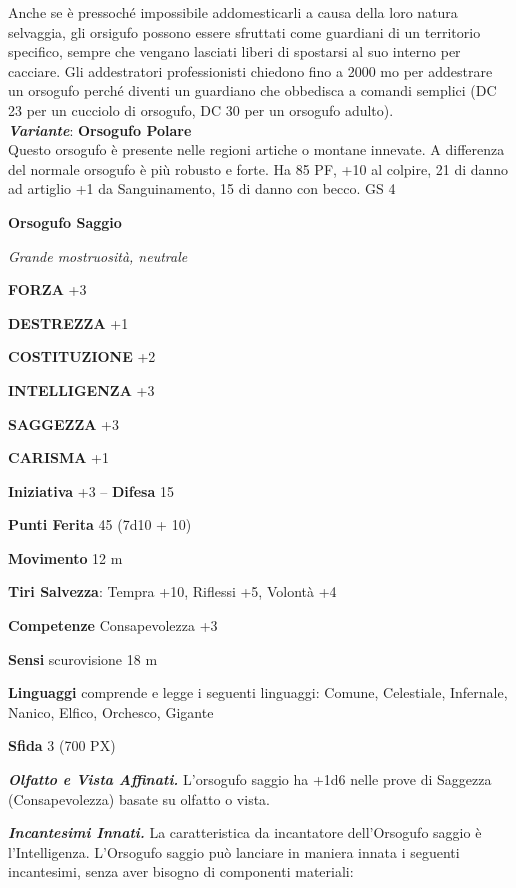 \begin{multicols}{2}
	Anche se è pressoché impossibile addomesticarli a causa della loro natura selvaggia, gli orsigufo possono essere sfruttati come guardiani di un territorio specifico, sempre che vengano lasciati liberi di spostarsi al suo interno per cacciare. Gli addestratori professionisti chiedono fino a 2000 mo per addestrare un orsogufo perché diventi un guardiano che obbedisca a comandi semplici (DC 23 per un cucciolo di orsogufo, DC 30 per un orsogufo adulto).\\

	\textit{\textbf{Variante}}: \textbf{Orsogufo Polare}\\
	Questo orsogufo è presente nelle regioni artiche o montane innevate. A differenza del normale orsogufo è più robusto e forte. Ha 85 PF, +10 al colpire, 21 di danno ad artiglio +1 da Sanguinamento, 15 di danno con becco. GS 4

	\medskip{}\textbf{Orsogufo Saggio}

	\textit{Grande mostruosità, neutrale}

	\textbf{FORZA} +3

	\textbf{DESTREZZA} +1

	\textbf{COSTITUZIONE} +2

	\textbf{INTELLIGENZA} +3

	\textbf{SAGGEZZA} +3

	\textbf{CARISMA} +1

	\textbf{Iniziativa} +3 -- \textbf{Difesa} 15

	\textbf{Punti Ferita} 45 (7d10 + 10)

	\textbf{Movimento} 12 m

	\textbf{Tiri Salvezza}: Tempra +10, Riflessi +5, Volontà +4

	\textbf{Competenze} Consapevolezza +3

	\textbf{Sensi} scurovisione 18 m

	\textbf{Linguaggi} comprende e legge i seguenti linguaggi: Comune, Celestiale, Infernale, Nanico, Elfico, Orchesco, Gigante

	\textbf{Sfida} 3 (700 PX)

	\textit{\textbf{Olfatto e Vista Affinati.}} L'orsogufo saggio ha +1d6 nelle prove di Saggezza (Consapevolezza) basate su olfatto o vista.

	\textit{\textbf{Incantesimi Innati.}} La caratteristica da incantatore dell'Orsogufo saggio è l'Intelligenza. L'Orsogufo saggio può lanciare in maniera innata i seguenti incantesimi, senza aver bisogno di componenti materiali:


\end{multicols}
